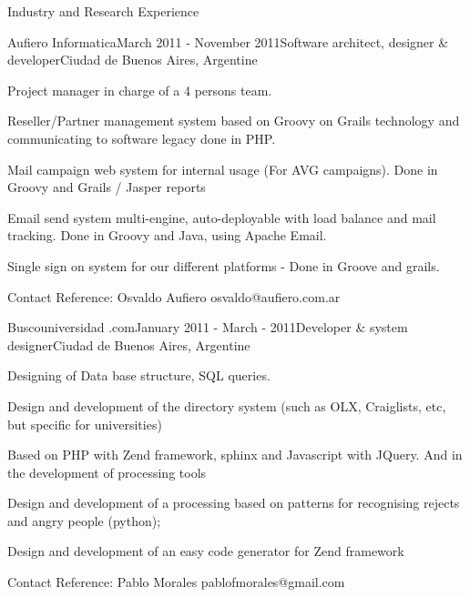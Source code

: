 \documentclass{resume} %
\begin{document}
\begin{rSection}{Industry and Research Experience}
\begin{rSubsection}{Aufiero Informatica}{March 2011 - November 2011}{Software architect, designer \& developer}{Ciudad de Buenos Aires, Argentine}
	\item Project manager in charge of a 4 persons team.
	\item Reseller/Partner management system based on Groovy on Grails technology and communicating to software legacy done in PHP.
	\item Mail campaign web system for internal usage (For AVG campaigns). Done in Groovy and Grails / Jasper reports
	\item Email send system multi-engine, auto-deployable with load balance and mail tracking. Done in Groovy and Java, using Apache Email. 
	\item Single sign on system for our different platforms - Done in Groove and grails.
	\item Contact Reference: Osvaldo Aufiero osvaldo@aufiero.com.ar
\end{rSubsection}


\begin{rSubsection}{Buscouniversidad .com}{January 2011 -  March - 2011}{Developer \& system designer}{Ciudad de Buenos Aires, Argentine}
	\item Designing of Data base structure, SQL queries. 
	\item Design and development of the directory system (such as OLX, Craiglists, etc, but specific for universities)
	\item Based on PHP with Zend framework, sphinx and Javascript with JQuery. And in the development of processing tools
	\item Design and development of a processing based on patterns for recognising rejects and angry people (python);
	\item Design and development of an easy code generator for Zend framework
	\item Contact Reference: Pablo Morales pablofmorales@gmail.com
\end{rSubsection}


\end{rSection}
\end{document}
